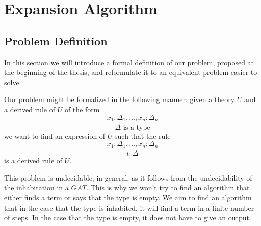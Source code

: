 \chapter{Expansion Algorithm}

\section{Problem Definition}

In this section we will introduce a formal definition of our 
problem, proposed at the beginning of the {\color{red} thesis}, %
and reformulate it to an equivalent problem easier to solve.

Our problem might be formalized in the following manner:
given a theory $U$ and a derived rule of $U$ of the form 
\begin{equation*}
    \dfrac{
        x_1 : \Delta_1, \dots, x_n : \Delta_n
    }{
        \Delta \text{ is a type}
    }
\end{equation*}
we want to find an expression of $U$ such that the rule 
\begin{equation*}
    \dfrac{
        x_1 : \Delta_1, \dots, x_n : \Delta_n
    }{
        t : \Delta 
    }
\end{equation*}
is a derived rule of $U$.

This problem is undecidable, in general, as it follows from the undecidability
of the inhabitation in a $GAT$. This is why we won't try to find
an algorithm that either finds a term or says that the type is empty.
We aim to find an algorithm that in the case that the type is 
inhabited, it will find a term in a finite number of steps.
In the case that the type is empty, it does not have to give an
output.

